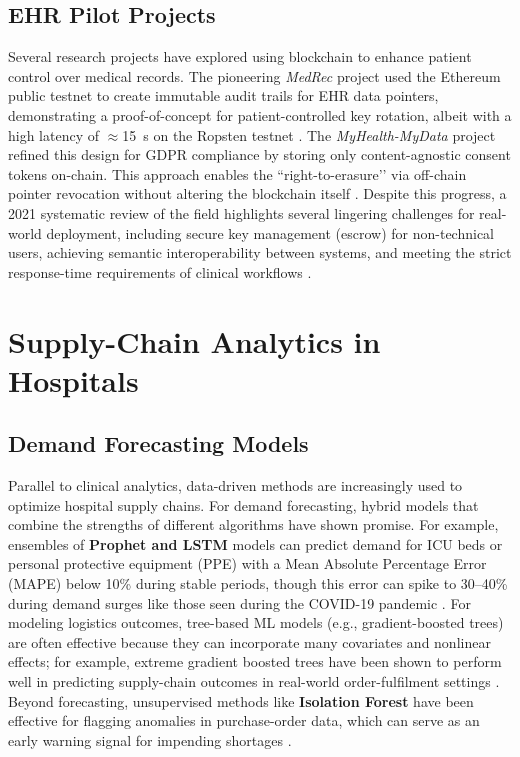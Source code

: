 \documentclass[12pt]{report}
\begin{document}
\subsection{EHR Pilot Projects}
Several research projects have explored using blockchain to enhance patient control over medical records. The pioneering \emph{MedRec} project used the Ethereum public testnet to create immutable audit trails for EHR data pointers, demonstrating a proof-of-concept for patient-controlled key rotation, albeit with a high latency of $\approx$15~s on the Ropsten testnet \cite{azaria2016medrec}. The \emph{MyHealth-MyData} project refined this design for GDPR compliance by storing only content-agnostic consent tokens on-chain. This approach enables the “right-to-erasure’’ via off-chain pointer revocation without altering the blockchain itself \cite{MHMD2017Whitepaper}. Despite this progress, a 2021 systematic review of the field highlights several lingering challenges for real-world deployment, including secure key management (escrow) for non-technical users, achieving semantic interoperability between systems, and meeting the strict response-time requirements of clinical workflows \cite{Radanovic2021ConsentBC}.

\section{Supply-Chain Analytics in Hospitals}\label{sec:supply_chain}

\subsection{Demand Forecasting Models}
Parallel to clinical analytics, data-driven methods are increasingly used to optimize hospital supply chains. For demand forecasting, hybrid models that combine the strengths of different algorithms have shown promise. For example, ensembles of \textbf{Prophet and LSTM} models can predict demand for ICU beds or personal protective equipment (PPE) with a Mean Absolute Percentage Error (MAPE) below 10\% during stable periods, though this error can spike to 30–40\% during demand surges like those seen during the COVID-19 pandemic \cite{Ribeiro2022ProphetLSTM}. For modeling logistics outcomes, tree-based ML models (e.g., gradient-boosted trees) are often effective because they can incorporate many covariates and nonlinear effects; for example, extreme gradient boosted trees have been shown to perform well in predicting supply-chain outcomes in real-world order-fulfilment settings \cite{ModerHoberg2024Complaints}. Beyond forecasting, unsupervised methods like \textbf{Isolation Forest} have been effective for flagging anomalies in purchase-order data, which can serve as an early warning signal for impending shortages \cite{Abdalla2023IFSC}.
\end{document}

